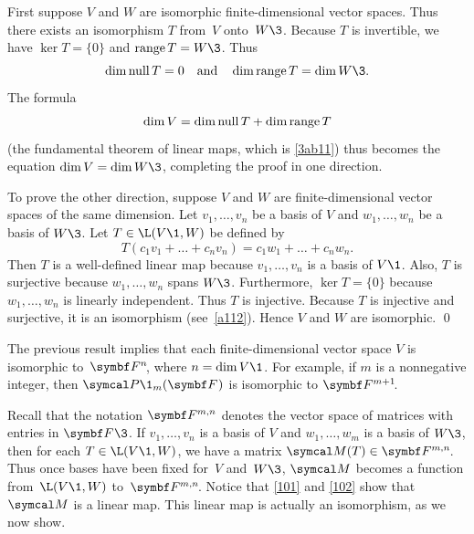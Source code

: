 
\proof
First suppose $V$ and $W$ are isomorphic finite-dimensional vector
spaces.  Thus there exists an isomorphism $T$ from~$V$ onto~$W\3$.
Because $T$ is invertible, we have $\ker T = \{0\}$ and
$\ran T = W\3$.  Thus
\[
\dim \ker T = 0 \andd \dim \ran T = \dim W\3.
\]
The formula
\[
\dim V = \dim \operatorname{null} T + \dim \operatorname{range} T
\]
(the fundamental theorem of linear maps, which is \ref{3ab11}) thus becomes the equation $\dim V = \dim W\3$, completing the proof in one direction.

To prove the other direction, suppose $V$ and $W$ are finite-dimensional
vector spaces of the same dimension.  Let $v_1, \dots, v_n$ be a basis of
$V$ and $w_1, \dots, w_n$ be a basis of $W\3$.  Let $T \in \L(V\1, W)$ be defined by
\[
T(c_1 v_1 + \dots + c_n v_n) = c_1 w_1 + \dots + c_n w_n.
\]
Then $T$ is a well-defined linear map because $v_1, \dots, v_n$ is a basis of $V\1$. Also, $T$ is surjective because $w_1, \dots, w_n$ spans $W\3$. Furthermore, $\ker T = \{0\}$ because $w_1, \dots, w_n$ is linearly independent. Thus $T$ is injective.  Because $T$ is injective and surjective, it is an isomorphism (see~\ref{a112}). Hence $V$  and $W$ are  isomorphic.
\qed


The previous result implies that each finite-dimensional vector space $V$ is isomorphic to~$\FF{n}$, where $n = \dim V\1$. For example, if $m$ is a nonnegative integer, then $\P\1_m(\F{})$ is isomorphic to $\FF{m+1}$.

Recall that the notation $\F{m,n}$ denotes the vector space of  matrices with entries in $\F{}\3$. If $v_1, \dots, v_n$ is a basis of $V$ and $w_1, \dots, w_m$ is a basis of $W\3$,
then for each $T \in \L(V\1,W)$, we have a matrix $\M(T) \in  \FF{m,n}$. Thus once bases have been fixed for~$V$ and~$W\3$, $\M$ becomes a function from~$\L(V\1,W)$ to~$\FF{m,n}$. Notice that
\ref{101} and \ref{102} show that $\M$ is a linear map.
This linear map is actually an isomorphism, as we now show.


